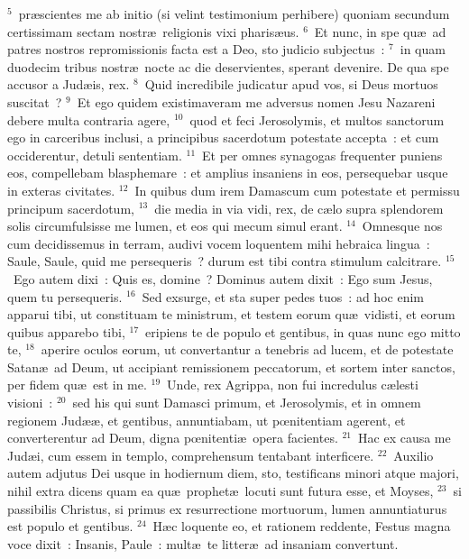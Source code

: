 ${}^{5}$~pr\ae scientes me ab initio (si velint testimonium perhibere) quoniam secundum certissimam sectam nostr\ae\ religionis vixi pharis\ae us.
${}^{6}$~Et nunc, in spe qu\ae\ ad patres nostros repromissionis facta est a Deo, sto judicio subjectus~:
${}^{7}$~in quam duodecim tribus nostr\ae\ nocte ac die deservientes, sperant devenire. De qua spe accusor a Jud\ae is, rex.
${}^{8}$~Quid incredibile judicatur apud vos, si Deus mortuos suscitat~?
${}^{9}$~Et ego quidem existimaveram me adversus nomen Jesu Nazareni debere multa contraria agere,
${}^{10}$~quod et feci Jerosolymis, et multos sanctorum ego in carceribus inclusi, a principibus sacerdotum potestate accepta~: et cum occiderentur, detuli sententiam.
${}^{11}$~Et per omnes synagogas frequenter puniens eos, compellebam blasphemare~: et amplius insaniens in eos, persequebar usque in exteras civitates.
${}^{12}$~In quibus dum irem Damascum cum potestate et permissu principum sacerdotum,
${}^{13}$~die media in via vidi, rex, de c\ae lo supra splendorem solis circumfulsisse me lumen, et eos qui mecum simul erant.
${}^{14}$~Omnesque nos cum decidissemus in terram, audivi vocem loquentem mihi hebraica lingua~: Saule, Saule, quid me persequeris~? durum est tibi contra stimulum calcitrare.
${}^{15}$~Ego autem dixi~: Quis es, domine~? Dominus autem dixit~: Ego sum Jesus, quem tu persequeris.
${}^{16}$~Sed exsurge, et sta super pedes tuos~: ad hoc enim apparui tibi, ut constituam te ministrum, et testem eorum qu\ae\ vidisti, et eorum quibus apparebo tibi,
${}^{17}$~eripiens te de populo et gentibus, in quas nunc ego mitto te,
${}^{18}$~aperire oculos eorum, ut convertantur a tenebris ad lucem, et de potestate Satan\ae\ ad Deum, ut accipiant remissionem peccatorum, et sortem inter sanctos, per fidem qu\ae\ est in me.
${}^{19}$~Unde, rex Agrippa, non fui incredulus c\ae lesti visioni~:
${}^{20}$~sed his qui sunt Damasci primum, et Jerosolymis, et in omnem regionem Jud\ae \ae , et gentibus, annuntiabam, ut pœnitentiam agerent, et converterentur ad Deum, digna pœnitenti\ae\ opera facientes.
${}^{21}$~Hac ex causa me Jud\ae i, cum essem in templo, comprehensum tentabant interficere.
${}^{22}$~Auxilio autem adjutus Dei usque in hodiernum diem, sto, testificans minori atque majori, nihil extra dicens quam ea qu\ae\ prophet\ae\ locuti sunt futura esse, et Moyses,
${}^{23}$~si passibilis Christus, si primus ex resurrectione mortuorum, lumen annuntiaturus est populo et gentibus.
${}^{24}$~H\ae c loquente eo, et rationem reddente, Festus magna voce dixit~: Insanis, Paule~: mult\ae\ te litter\ae\ ad insaniam convertunt.

